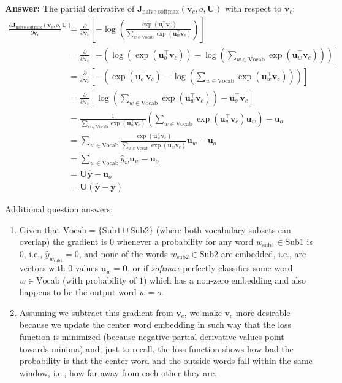 \documentclass{article}
\newenvironment{answer}{
    {\bf Answer:} \sf \begingroup\color{red}
}{\endgroup}%
\begin{document}
\begin{enumerate}[label=(\alph*)]
\begin{shaded}
\begin{answer} The partial derivative of $\bm J_{\text{naive-softmax}}(\bm v_c, o, \bm U)$ with respect to $\bm v_c$:
\begin{align}
\frac{\partial \bm J_{\text{naive-softmax}}(\bm v_c, o, \bm U)}{\partial \bm v_c} &= \frac{\partial}{\partial \bm v_c} \left[-\log\left(\frac{\exp(\bm u_{o}^\top \bm v_c)}{\sum_{w \in \text{Vocab}} \exp(\bm u_{w}^\top \bm v_c)} \right)\right] \\
&=\frac{\partial}{\partial \bm v_c} \left[- \left(\log\left(\exp(\bm u_{o}^\top \bm v_c)\right) - \log\left(\sum_{w \in \text{Vocab}} \exp(\bm u_{w}^\top \bm v_c)\right)\right)\right] \\
&=\frac{\partial}{\partial \bm v_c} \left[- \left(\exp(\bm u_{o}^\top \bm v_c) - \log\left(\sum_{w \in \text{Vocab}} \exp(\bm u_{w}^\top \bm v_c)\right)\right)\right] \\
&=\label{simplification}\frac{\partial}{\partial \bm v_c} \left[\log\left(\sum_{w \in \text{Vocab}} \exp(\bm u_{w}^\top \bm v_c)\right)-\bm u_{o}^\top \bm v_c\right] \\
&=\frac{1}{\sum_{w \in \text{Vocab}} \exp(\bm u_{w}^\top \bm v_c)}\left(\sum_{w \in \text{Vocab}} \exp(\bm u_{w}^\top \bm v_c)\bm u_w\right) - \bm u_o \\
&= \sum_{w \in \text{Vocab}} \frac{\exp(\bm u_{w}^\top \bm v_c)}{\sum_{w \in \text{Vocab}} \exp(\bm u_{w}^\top \bm v_c)}\bm u_w - \bm u_o \\
&= \sum_{w \in \text{Vocab}} \hat{y}_w \bm u_w - \bm u_o \\
&= \bm U \hat{\bm y} - \bm u_o \\
&= \bm U (\hat{\bm y} - \bm y)
\end{align}

\hfill

\color{red} Additional question answers:
\begin{enumerate}[label=(\arabic*)]
    \item Given that $\text{Vocab}=\{\text{Sub1} \cup \text{Sub2}\}$ (where both vocabulary subsets can overlap) the gradient is $0$ whenever a probability for any word $w_{\text{sub1}}\in \text{Sub1}$ is $0$, i.e., $\hat{y}_{w_{\text{sub1}}}=0$, and none of the words $w_{\text{sub2}}\in \text{Sub2}$ are embedded, i.e., are vectors with $0$ values $\bm u_w = \bm 0$, or if \textit{softmax} perfectly classifies some word $w\in\text{Vocab}$ (with probability of $1$) which has a non-zero embedding and also happens to be the output word $w=o$.
    \item Assuming we subtract this gradient from $\bm v_c$, we make $\bm v_c$ more desirable because we update the center word embedding in such way that the loss function is minimized (because negative partial derivative values point towards minima) and, just to recall, the loss function shows how bad the probability is that the center word and the outside words fall within the same window, i.e., how far away from each other they are.
\end{enumerate}


\end{answer}
\end{shaded}
\end{enumerate}
\end{document}
